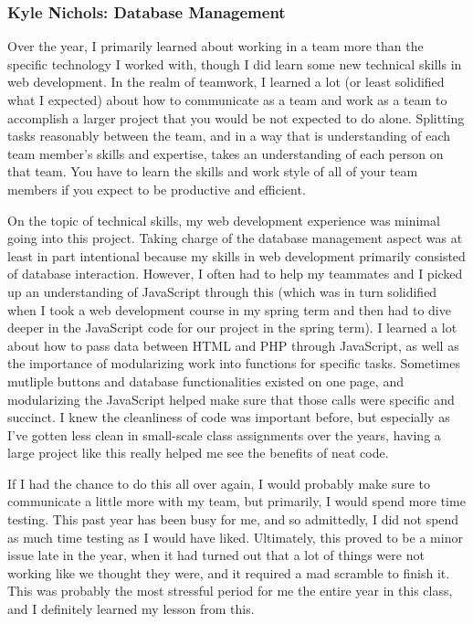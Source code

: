 \documentclass[../final.tex]{subfiles}
\begin{document}
\subsubsection{Kyle Nichols: Database Management}
Over the year, I primarily learned about working in a team more than the specific technology I worked with, though I did learn some new technical skills in web development.
In the realm of teamwork, I learned a lot (or least solidified what I expected) about how to communicate as a team and work as a team to accomplish a larger project that you would be not expected to do alone.
Splitting tasks reasonably between the team, and in a way that is understanding of each team member's skills and expertise, takes an understanding of each person on that team.
You have to learn the skills and work style of all of your team members if you expect to be productive and efficient.

On the topic of technical skills, my web development experience was minimal going into this project.
Taking charge of the database management aspect was at least in part intentional because my skills in web development primarily consisted of database interaction.
However, I often had to help my teammates and I picked up an understanding of JavaScript through this (which was in turn solidified when I took a web development course in my spring term and then had to dive deeper in the JavaScript code for our project in the spring term).
I learned a lot about how to pass data between HTML and PHP through JavaScript, as well as the importance of modularizing work into functions for specific tasks.
Sometimes mutliple buttons and database functionalities existed on one page, and modularizing the JavaScript helped make sure that those calls were specific and succinct.
I knew the cleanliness of code was important before, but especially as I've gotten less clean in small-scale class assignments over the years, having a large project like this really helped me see the benefits of neat code.

If I had the chance to do this all over again, I would probably make sure to communicate a little more with my team, but primarily, I would spend more time testing.
This past year has been busy for me, and so admittedly, I did not spend as much time testing as I would have liked.
Ultimately, this proved to be a minor issue late in the year, when it had turned out that a lot of things were not working like we thought they were, and it required a mad scramble to finish it.
This was probably the most stressful period for me the entire year in this class, and I definitely learned my lesson from this.
\end{document}
